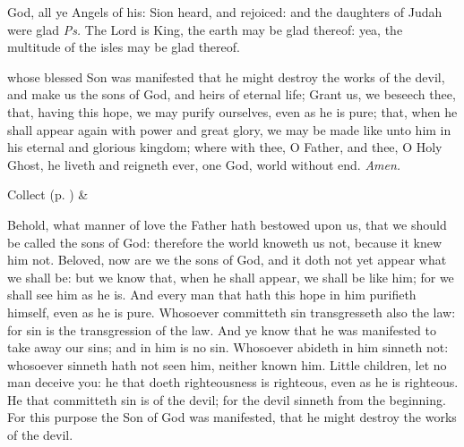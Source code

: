 \vspace{-0.4\baselineskip}

\introit
{} God, all ye Angels of his: Sion heard, and rejoiced: and the daughters of Judah were glad \textit{Ps.} The Lord is King, the earth may be glad thereof: yea, the multitude of the isles may be glad thereof.

\vspace{-0.3\baselineskip}

\collect
{} whose blessed Son was manifested that he might destroy the works of the devil, and make us the sons of God, and heirs of eternal life; Grant us, we beseech thee, that, having this hope, we may purify ourselves, even as he is pure; that, when he shall appear again with power and great glory, we may be made like unto him in his eternal and glorious kingdom; where with thee, O Father, and thee, O Holy Ghost, he liveth and reigneth ever, one God, world without end. \textit{Amen.}
\begin{rubric}
     Collect  (p. \pageref{SPSaints}) \&  
\end{rubric}

\vspace{-0.3\baselineskip}

 Behold, what manner of love the Father hath bestowed upon us, that we should be called the sons of God: therefore the world knoweth us not, because it knew him not. Beloved, now are we the sons of God, and it doth not yet appear what we shall be: but we know that, when he shall appear, we shall be like him; for we shall see him as he is. And every man that hath this hope in him purifieth himself, even as he is pure. Whosoever committeth sin transgresseth also the law: for sin is the transgression of the law. And ye know that he was manifested to take away our sins; and in him is no sin. Whosoever abideth in him sinneth not: whosoever sinneth hath not seen him, neither known him. Little children, let no man deceive you: he that doeth righteousness is righteous, even as he is righteous. He that committeth sin is of the devil; for the devil sinneth from the beginning. For this purpose the Son of God was manifested, that he might destroy the works of the devil.



